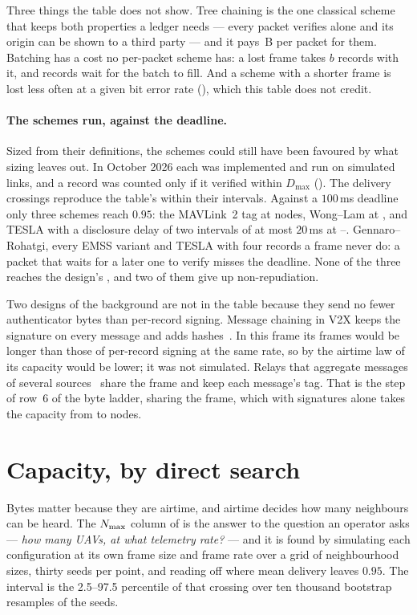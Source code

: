 Three things the table does not show. Tree chaining is the one classical scheme that keeps both
properties a ledger needs --- every packet verifies alone and its origin can be shown to a
third party --- and it pays
\strAuthWl\,B per packet for them. Batching has a cost no per-packet scheme has: a lost frame
takes $b$ records with it, and records wait for the batch to fill. And a scheme with a shorter
frame is lost less often at a given bit error rate (), which this table does not
credit.

\paragraph{The schemes run, against the deadline.} Sized from their definitions, the schemes
could still have been favoured by what sizing leaves out. In October 2026 each was implemented
and run on simulated links, and a record was counted only if it verified within $D_{\max}$
(). The delivery crossings reproduce the table's within their
intervals. Against a $100$\,ms deadline only three schemes reach $0.95$: the MAVLink~2 tag at
\sdMav{} nodes, Wong--Lam at \sdWl, and TESLA with a disclosure delay of two intervals of at most
$20$\,ms at \sdTeslaLo--\sdTeslaHi. Gennaro--Rohatgi, every EMSS variant and TESLA with four
records a frame never do: a packet that waits for a later one to verify misses the deadline.
None of the three reaches the design's \strNmaxDesign, and two of them give up
non-repudiation.

Two designs of the background are not in the table because they send no fewer authenticator
bytes than per-record signing. Message chaining in V2X keeps the signature on every message and
adds hashes~\cite{cominetti2022chaining}. In this frame its frames would be longer than those of
per-record signing at the same rate, so by the airtime law of  its capacity would
be lower; it was not simulated. Relays that aggregate messages of several
sources~\cite{rotta2024telemetrybroadcast} share the frame and keep each message's tag. That is
the step of row~6 of the byte ladder, sharing the frame, which with signatures alone takes the
capacity from \nmaxLeanBase{} to \nmaxLeanInline{} nodes.

\section{Capacity, by direct search}\label{sec:capacity}

Bytes matter because they are airtime, and airtime decides how many neighbours can be heard. The
$N_{\max}$ column of  is the answer to the question an operator asks --- \emph{how
many UAVs, at what telemetry rate?} --- and it is found by simulating each configuration at its
own frame size and frame rate over a grid of neighbourhood sizes, thirty seeds per point, and
reading off where mean delivery leaves $0.95$. The interval is the 2.5--97.5 percentile of that
crossing over ten thousand bootstrap resamples of the seeds.

